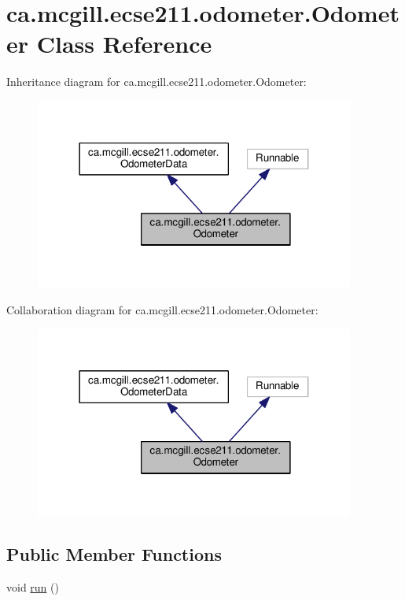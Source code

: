\hypertarget{classca_1_1mcgill_1_1ecse211_1_1odometer_1_1_odometer}{}\section{ca.\+mcgill.\+ecse211.\+odometer.\+Odometer Class Reference}
\label{classca_1_1mcgill_1_1ecse211_1_1odometer_1_1_odometer}


Inheritance diagram for ca.\+mcgill.\+ecse211.\+odometer.\+Odometer\+:\nopagebreak
\begin{figure}[H]
\begin{center}
\leavevmode
\includegraphics[width=298pt]{classca_1_1mcgill_1_1ecse211_1_1odometer_1_1_odometer__inherit__graph}
\end{center}
\end{figure}


Collaboration diagram for ca.\+mcgill.\+ecse211.\+odometer.\+Odometer\+:\nopagebreak
\begin{figure}[H]
\begin{center}
\leavevmode
\includegraphics[width=298pt]{classca_1_1mcgill_1_1ecse211_1_1odometer_1_1_odometer__coll__graph}
\end{center}
\end{figure}
\subsection*{Public Member Functions}
\begin{DoxyCompactItemize}
\item 
void \hyperlink{classca_1_1mcgill_1_1ecse211_1_1odometer_1_1_odometer_af0ff4c5121973a8310cf986e25fa0d87}{run} ()
\end{DoxyCompactItemize}
